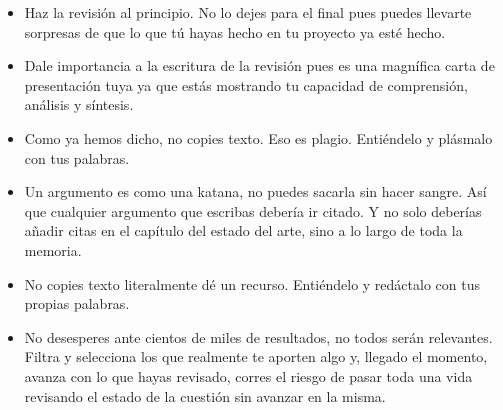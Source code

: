 \begin{itemize}
    \item Haz la revisión al principio. No lo dejes para el final pues puedes llevarte sorpresas de que lo que tú hayas hecho en tu proyecto ya esté hecho.
    \item Dale importancia a la escritura de la revisión pues es una magnífica carta de presentación tuya ya que estás mostrando tu capacidad de comprensión, análisis y síntesis.
    \item Como ya hemos dicho, no copies texto. Eso es plagio. Entiéndelo y plásmalo con tus palabras.
    \item Un argumento es como una katana, no puedes sacarla sin hacer sangre. Así que cualquier argumento que escribas debería ir citado. Y no solo deberías añadir citas en el capítulo del estado del arte, sino a lo largo de toda la memoria.
    \item No copies texto literalmente dé un recurso. Entiéndelo y redáctalo con tus propias palabras.
    \item No desesperes ante cientos de  miles de resultados, no todos serán relevantes. Filtra y selecciona los que realmente te aporten algo y, llegado el momento, avanza con lo que hayas revisado, corres el riesgo de pasar toda una vida revisando el estado de la cuestión sin avanzar en la misma.   
\end{itemize}
